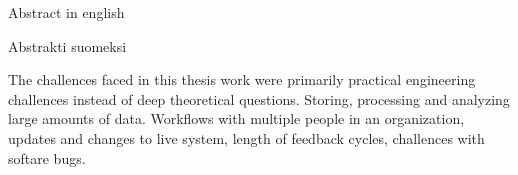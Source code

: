 \makecoverpage
\makecopyrightpage

\begin{abstractpage}[english]
Abstract in english
\end{abstractpage}

\begin{abstractpage}[finnish]
Abstrakti suomeksi
\end{abstractpage}

The challences faced in this thesis work were primarily practical engineering challences instead of deep theoretical questions.
Storing, processing and analyzing large amounts of data.
Workflows with multiple people in an organization, updates and changes to live system, length of feedback cycles, challences with softare bugs.

\newpage

\setcounter{tocdepth}{2}
\thesistableofcontents
